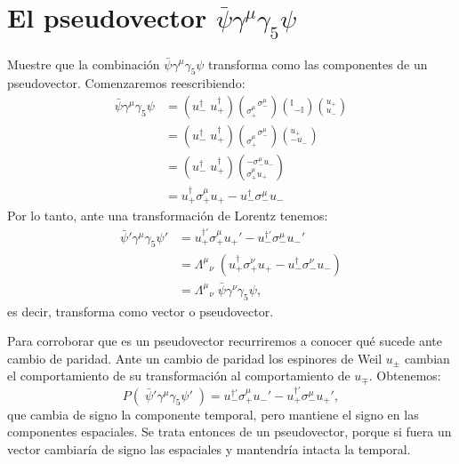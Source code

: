 \section{El pseudovector $\bar\psi\gamma^\mu\gamma_5\psi$}
\begingroup\color{blue}
Muestre que la combinación $\bar\psi\gamma^\mu\gamma_5\psi$ transforma como las componentes de un pseudovector.
\endgroup
Comenzaremos reescribiendo:
\begin{equation}\begin{split}
\bar\psi\gamma^\mu\gamma_5\psi
&=
\left(
u_-^\dagger\;u_+^\dagger
\right)
\left(
{}_{\sigma_+^\mu}{}^{\sigma_-^\mu}
\right)
\left(
{}^{\mathbb I}
{}_{-\mathbb I}
\right)
\left({}_{u_-}^{u_+}\right)\\
&=
\left(
u_-^\dagger\;u_+^\dagger
\right)
\left(
{}_{\sigma_+^\mu}{}^{\sigma_-^\mu}
\right)
\left({}_{-u_-}^{u_+}\right)\\
&=
\left(
u_-^\dagger\;u_+^\dagger
\right)
\left({}^{-\sigma_-^\mu u_-}_{\sigma_+^\mu u_+}\right)\\
&=u_+^\dagger\sigma_+^\mu u_+ - u_-^\dagger\sigma_-^\mu u_-
\end{split}\end{equation}
Por lo tanto, ante una transformación de Lorentz tenemos:
\begin{equation}\begin{split}
\bar\psi'\gamma^\mu\gamma_5\psi'
&=u_+^{\dagger\prime}\sigma_+^\mu u_+' - u_-^{\dagger\prime}\sigma_-^\mu u_-'\\
&=\Lambda^\mu{}_\nu\;(u_+^\dagger\sigma_+^\nu u_+ - u_-^\dagger\sigma_-^\nu u_-)\\
&=\Lambda^\mu{}_\nu\;\bar\psi\gamma^\nu\gamma_5\psi,
\end{split}\end{equation}
es decir, transforma como vector o pseudovector.
\par Para corroborar que es un pseudovector recurriremos a conocer qué sucede ante cambio de paridad. Ante un cambio de paridad los espinores de Weil $u_\pm$ cambian el comportamiento de su transformación al comportamiento de $u_\mp$. Obtenemos:
\begin{equation}
P(\;\bar\psi'\gamma^\mu\gamma_5\psi'\;)
=u_-^{\dagger\prime}\sigma_+^\mu u_-' - u_+^{\dagger\prime}\sigma_-^\mu u_+',
\end{equation}
que cambia de signo la componente temporal, pero mantiene el signo en las componentes espaciales. Se trata entonces de un pseudovector, porque si fuera un vector cambiaría de signo las espaciales y mantendría intacta la temporal.

















